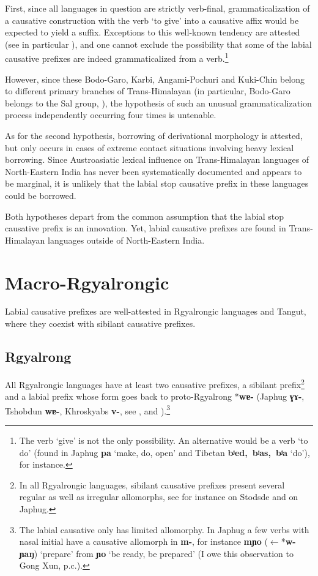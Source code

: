 \documentclass[oneside,a4paper,11pt]{article}
\newcommand{\ipa}[1]{\textbf{{\phon\mbox{#1}}}} %
\begin{document}
First, since all languages in question are strictly verb-final, grammaticalization of a causative construction with the verb `to give' into a causative affix would be expected to yield a suffix. Exceptions to this well-known tendency are attested (see in particular \citealt{jacques13harmonization}), and one cannot exclude the possibility that some of the labial causative prefixes are indeed grammaticalized from a verb.\footnote{The verb `give' is not the only possibility. An alternative would be a verb `to do' (found in Japhug \ipa{pa} `make, do, open' and Tibetan \ipa{bʲed, bʲas, bʲa} `do'), for instance.} 

However, since these   Bodo-Garo, Karbi, Angami-Pochuri and Kuki-Chin belong to different primary branches of Trans-Himalayan (in particular, Bodo-Garo belongs to the Sal group, \citealt{burling83sal}), the hypothesis of such an unusual grammaticalization process independently occurring four times is untenable.

As for the second hypothesis, borrowing of derivational morphology is attested, but only occurs in cases of extreme contact situations involving heavy lexical borrowing. Since Austroasiatic lexical influence on Trans-Himalayan languages of North-Eastern India has never been systematically documented and appears to be marginal, it is unlikely that the labial stop causative prefix in these languages could be borrowed.

Both hypotheses depart from the common assumption that the labial stop causative prefix is an innovation. Yet, labial causative prefixes are found in Trans-Himalayan languages outside of North-Eastern India. 

\section{Macro-Rgyalrongic}
Labial causative prefixes are well-attested in Rgyalrongic languages and Tangut, where they coexist with sibilant causative prefixes.

\subsection{Rgyalrong}
All Rgyalrongic languages have at least two causative prefixes, a sibilant prefix\footnote{In all Rgyalrongic languages, sibilant causative prefixes present several regular as well as irregular allomorphs, see for instance \citealt{jackson07shangzhai} on Stodsde and \citealt{jacques15causative} on Japhug.} and a labial prefix whose form goes back to proto-Rgyalrong *\ipa{wɐ-} (Japhug \ipa{ɣɤ-}, Tshobdun \ipa{wɐ-}, Khroskyabs \ipa{v-}, see \citealt[322]{jacques04these}, \citealt{jackson06paisheng} and \citealt[136]{lai13affixale}).\footnote{The labial causative only has limited allomorphy. In Japhug a few verbs with nasal initial have a causative allomorph in \ipa{m-}, for instance \ipa{mɲo} ($\leftarrow$*\ipa{w-ɲaŋ}) `prepare' from \ipa{ɲo} `be ready, be prepared' (I owe this observation to Gong Xun, p.c.).}
\end{document}
